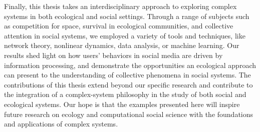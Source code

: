 Finally, this thesis takes an interdisciplinary approach to exploring complex systems in both ecological and social settings. Through a range of subjects such as competition for space, survival in ecological communities, and collective attention in social systems, we employed a variety of tools and techniques, like network theory, nonlinear dynamics, data analysis, or machine learning. Our results shed light on how users' behaviors in social media are driven by information processing, and demonstrate the opportunities an ecological approach can present to the understanding of collective phenomena in social systems. The contributions of this thesis extend beyond our specific research and contribute to the integration of a complex-system philosophy in the study of both social and ecological systems. Our hope is that the examples presented here will inspire future research on ecology and computational social science with the foundations and applications of complex systems.



 
